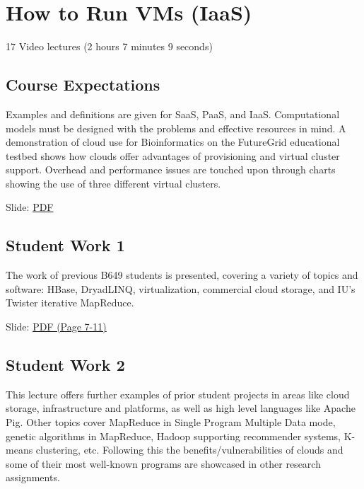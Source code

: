 \section{How to Run VMs (IaaS)}

  17 Video lectures (2 hours 7 minutes 9 seconds)

\subsection{Course Expectations}

Examples and definitions are given for SaaS, PaaS, and IaaS.
Computational models must be designed with the problems and effective
resources in mind. A demonstration of cloud use for Bioinformatics on
the FutureGrid educational testbed shows how clouds offer advantages of
provisioning and virtual cluster support. Overhead and performance
issues are touched upon through charts showing the use of three
different virtual clusters.


  Slide:
  \href{https://drive.google.com/open?id=0B88HKpainTSfQU1uQmxZWHdWQ1k}{PDF}

\subsection{Student Work 1}

The work of previous B649 students is presented, covering a variety of
topics and software: HBase, DryadLINQ, virtualization, commercial cloud
storage, and IU's Twister iterative MapReduce.


  Slide:
  \href{https://drive.google.com/open?id=0B88HKpainTSfQU1uQmxZWHdWQ1k}{PDF
  (Page 7-11)}

\subsection{Student Work 2}

This lecture offers further examples of prior student projects in areas
like cloud storage, infrastructure and platforms, as well as high level
languages like Apache Pig. Other topics cover MapReduce in Single
Program Multiple Data mode, genetic algorithms in MapReduce, Hadoop
supporting recommender systems, K-means clustering, etc. Following this
the benefits/vulnerabilities of clouds and some of their most well-known
programs are showcased in other research assignments.

